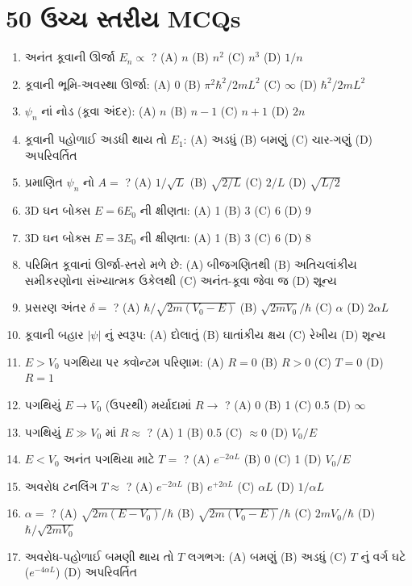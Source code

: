 \section{50 ઉચ્ચ સ્તરીય MCQs}

\begin{enumerate}[label=\textbf{\arabic*.}]
  \item અનંત કૂવાની ઊર્જા $E_n\propto$ ? (A) $n$ (B) $n^{2}$ (C) $n^{3}$ (D) $1/n$
  \item કૂવાની ભૂમિ-અવસ્થા ઊર્જા: (A) 0 (B) $\pi^{2}\hbar^{2}/2mL^{2}$ (C) $\infty$ (D) $\hbar^{2}/2mL^{2}$
  \item $\psi_n$ નાં નોડ (કૂવા અંદર): (A) $n$ (B) $n-1$ (C) $n+1$ (D) $2n$
  \item કૂવાની પહોળાઈ અડધી થાય તો $E_1$: (A) અડધું (B) બમણું (C) ચાર-ગણું (D) અપરિવર્તિત
  \item પ્રમાણિત $\psi_n$ નો $A=$ ? (A) $1/\sqrt L$ (B) $\sqrt{2/L}$ (C) $2/L$ (D) $\sqrt{L/2}$
  \item 3D ઘન બોક્સ $E=6E_0$ ની ક્ષીણતા: (A) 1 (B) 3 (C) 6 (D) 9
  \item 3D ઘન બોક્સ $E=3E_0$ ની ક્ષીણતા: (A) 1 (B) 3 (C) 6 (D) 8
  \item પરિમિત કૂવાનાં ઊર્જા-સ્તરો મળે છે: (A) બીજગણિતથી (B) અતિચલાંકીય સમીકરણોના સંખ્યાત્મક ઉકેલથી (C) અનંત-કૂવા જેવા જ (D) શૂન્ય
  \item પ્રસરણ અંતર $\delta=$ ? (A) $\hbar/\sqrt{2m(V_0-E)}$ (B) $\sqrt{2mV_0}/\hbar$ (C) $\alpha$ (D) $2\alpha L$
  \item કૂવાની બહાર $|\psi|$ નું સ્વરૂપ: (A) દોલાતું (B) ઘાતાંકીય ક્ષય (C) રેખીય (D) શૂન્ય
  \item $E>V_0$ પગથિયા પર ક્વોન્ટમ પરિણામ: (A) $R=0$ (B) $R>0$ (C) $T=0$ (D) $R=1$
  \item પગથિયું $E\to V_0$ (ઉપરથી) મર્યાદામાં $R\to$ ? (A) 0 (B) 1 (C) 0.5 (D) $\infty$
  \item પગથિયું $E\gg V_0$ માં $R\approx$ ? (A) 1 (B) 0.5 (C) $\approx0$ (D) $V_0/E$
  \item $E<V_0$ અનંત પગથિયા માટે $T=$ ? (A) $e^{-2\alpha L}$ (B) 0 (C) 1 (D) $V_0/E$
  \item અવરોધ ટનલિંગ $T\approx$ ? (A) $e^{-2\alpha L}$ (B) $e^{+2\alpha L}$ (C) $\alpha L$ (D) $1/\alpha L$
  \item $\alpha=$ ? (A) $\sqrt{2m(E-V_0)}/\hbar$ (B) $\sqrt{2m(V_0-E)}/\hbar$ (C) $2mV_0/\hbar$ (D) $\hbar/\sqrt{2mV_0}$
  \item અવરોધ-પહોળાઈ બમણી થાય તો $T$ લગભગ: (A) બમણું (B) અડધું (C) $T$ નું વર્ગ ઘટે ($e^{-4\alpha L}$) (D) અપરિવર્તિત

\end{enumerate}
